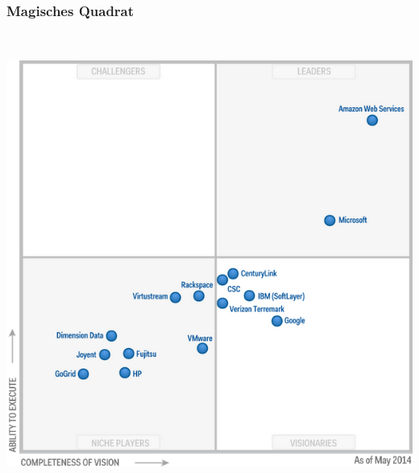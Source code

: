 \documentclass[13pt,a4paper,bibliography=totocnumbered,listof=totocnumbered]{scrartcl}
\begin{document}
\subsubsection{Magisches Quadrat}
$\;$\\
\begin{minipage}{\linewidth}
	\centering
	\includegraphics[width=0.5\linewidth]{./img/Gartner_Magic_Square.png}
	\label{Gartner}
\end{minipage}
\end{document}
